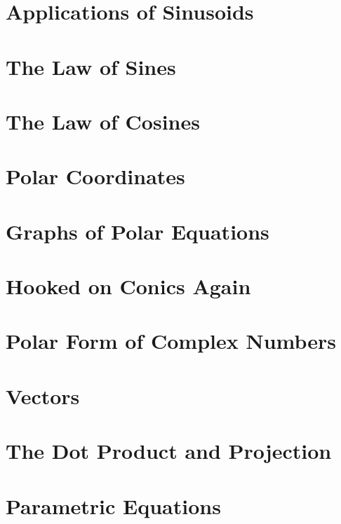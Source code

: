 \section{Applications of Sinusoids}



\newpage

\section{The Law of Sines}



\newpage

\section{The Law of Cosines}



\newpage

\section{Polar Coordinates}



\newpage

\section{Graphs of Polar Equations}



\newpage

\section{Hooked on Conics Again}



\newpage

\section{Polar Form of Complex Numbers}



\newpage

\section{Vectors}



\newpage

\section{The Dot Product and Projection}



\newpage

\section{Parametric Equations}



\newpage